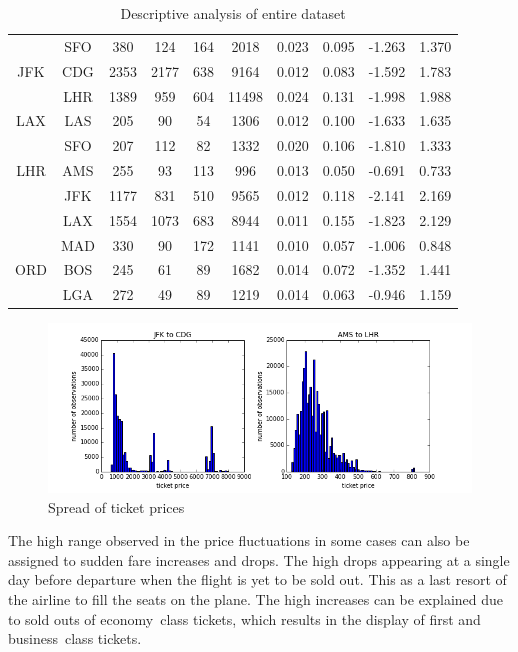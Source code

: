 \begin{table}
\begin{tabular}{c c | c c c c | c c c c}
~    &  SFO  &   380  &   124  &   164  &  2018  &  0.023  &  0.095  &  -1.263  &  1.370  \\[.5ex]
JFK  &  CDG  &  2353  &  2177  &   638  &  9164  &  0.012  &  0.083  &  -1.592  &  1.783  \\
~    &  LHR  &  1389  &   959  &   604  &  11498  &  0.024  &  0.131  &  -1.998  &  1.988  \\[.5ex]
LAX  &  LAS  &   205  &    90  &    54  &  1306  &  0.012  &  0.100  &  -1.633  &  1.635  \\
~    &  SFO  &   207  &   112  &    82  &  1332  &  0.020  &  0.106  &  -1.810  &  1.333  \\[.5ex]
LHR  &  AMS  &   255  &    93  &   113  &   996  &  0.013  &  0.050  &  -0.691  &  0.733  \\
~    &  JFK  &  1177  &   831  &   510  &  9565  &  0.012  &  0.118  &  -2.141  &  2.169  \\
~    &  LAX  &  1554  &  1073  &   683  &  8944  &  0.011  &  0.155  &  -1.823  &  2.129  \\
~    &  MAD  &   330  &    90  &   172  &  1141  &  0.010  &  0.057  &  -1.006  &  0.848  \\[.5ex]
ORD  &  BOS  &   245  &    61  &    89  &  1682  &  0.014  &  0.072  &  -1.352  &  1.441  \\
~    &  LGA  &   272  &    49  &    89  &  1219  &  0.014  &  0.063  &  -0.946  &  1.159  \\
\bottomrule
\end{tabular}
\caption{Descriptive analysis of entire dataset}
\label{tbl:DescriptiveAnalysisEntireDataset}
\end{table}


\begin{figure}
\centering
\includegraphics[width=.8\textwidth]{figures/Spread_JFK-CDG}
\caption{Spread of ticket prices}
\label{fig:SpreadOfTicketPrices}
\end{figure}


The high range observed in the price fluctuations in some cases can also be assigned to sudden fare increases and drops. The high drops appearing at a single day before departure when the flight is yet to be sold out. This as a last resort of the airline to fill the seats on the plane. The high increases can be explained due to sold outs of economy~class tickets, which results in the display of first and business~class tickets.

